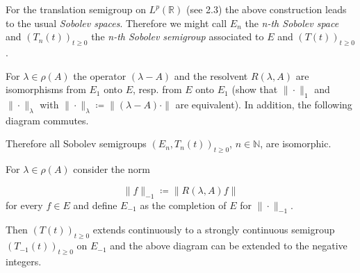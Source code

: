 For the translation semigroup on $L^{p}(\mathbb{R})$ (see 2.3) the above construction leads to the usual \emph{Sobolev spaces}.
Therefore we might call $E_{n}$ the \emph{n-th Sobolev space} and $(T_{n}(t))_{t \geq 0}$ the \emph{n-th Sobolev semigroup} associated to $E$ and $(T(t))_{t \geq 0}$.
\begin{remark}\label{rem:a1-19.1}
For $\lambda \in \rho(A)$ the operator $(\lambda - A)$ and the resolvent $R(\lambda,A)$ are isomorphisms from $E_{1}$ onto $E$, resp. from $E$ onto $E_{1}$ (show that $\|\cdot\|_{1}$ and $\|\cdot\|_{\lambda}$ with $\|\cdot\|_{\lambda} \coloneqq \|(\lambda - A)\cdot\|$ are equivalent).
In addition, the following diagram commutes. 
\begin{center}
\end{center}
Therefore all Sobolev semigroups $(E_{n}, T_{n}(t))_{t \geq 0}$, $n \in \mathbb{N}$, are isomorphic.
\end{remark}

\begin{remark}\label{rem:a1-19.2}
For $\lambda \in \rho(A)$ consider the norm

\[
    \|f\|_{-1} \coloneqq \|R(\lambda,A)f\|
\]
for every $f \in E$ and define $E_{-1}$ as the completion of $E$ for $\|\cdot\|_{-1}$.
\end{remark}
Then $(T(t))_{t \geq 0}$ extends continuously to a strongly continuous semigroup $(T_{-1}(t))_{t \geq 0}$ on $E_{-1}$ and the above diagram can be extended to the negative integers.

